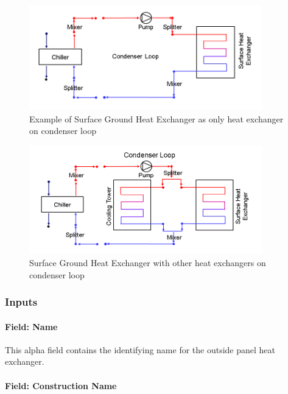 \begin{figure}[hbtp] %
\centering
\includegraphics[width=0.9\textwidth, height=0.9\textheight, keepaspectratio=true]{media/image205.png}
\caption{Example of Surface Ground Heat Exchanger as only heat exchanger on condenser loop \protect \label{fig:example-of-surface-ground-heat-exchanger}}
\end{figure}

\begin{figure}[hbtp] %
\centering
\includegraphics[width=0.9\textwidth, height=0.9\textheight, keepaspectratio=true]{media/image206.png}
\caption{Surface Ground Heat Exchanger with other heat exchangers on condenser loop \protect \label{fig:surface-ground-heat-exchanger-with-other-heat}}
\end{figure}

\subsubsection{Inputs}\label{inputs-13-002}

\paragraph{Field: Name}\label{field-name-12-001}

This alpha field contains the identifying name for the outside panel heat exchanger.

\paragraph{Field: Construction Name}\label{field-construction-name-000}

